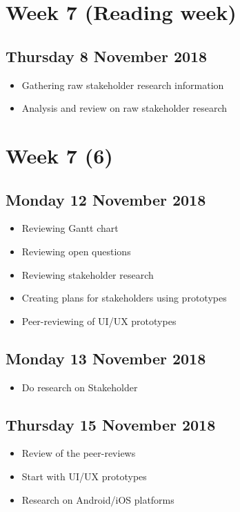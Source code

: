 \section*{Week 7 (Reading week)}
\subsection*{Thursday 8 November 2018}
\begin{itemize}
	\item Gathering raw stakeholder research information
	\item Analysis and review on raw stakeholder research
\end{itemize}

\section*{Week 7 (6)}
\subsection*{Monday 12 November 2018}
\begin{itemize}
	\item Reviewing Gantt chart
    \item Reviewing open questions
    \item Reviewing stakeholder research
    \item Creating plans for stakeholders using prototypes
    \item Peer-reviewing of UI/UX prototypes
\end{itemize}

\subsection*{Monday 13 November 2018}
\begin{itemize}
	\item Do research on Stakeholder
\end{itemize}

\subsection*{Thursday 15 November 2018}
\begin{itemize}
	\item Review of the peer-reviews
	\item Start with UI/UX prototypes
	\item Research on Android/iOS platforms
\end{itemize}

